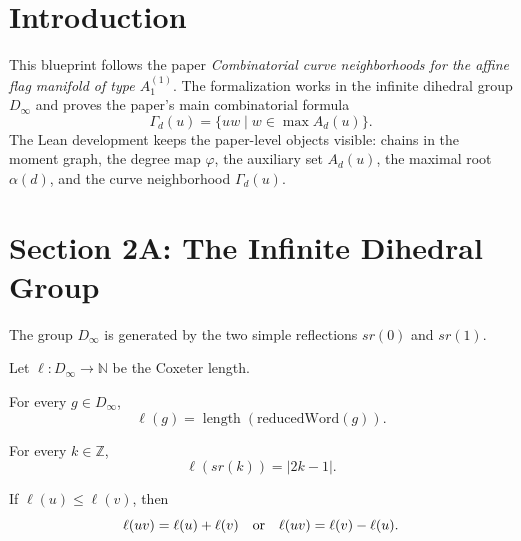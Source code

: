 \chapter{Introduction}

This blueprint follows the paper \emph{Combinatorial curve neighborhoods for
the affine flag manifold of type $A_1^{(1)}$}.  The formalization works in the
infinite dihedral group $D_\infty$ and proves the paper's main combinatorial
formula
\[
  \Gamma_d(u)=\{u w \mid w\in \max A_d(u)\}.
\]
The Lean development keeps the paper-level objects visible: chains in the
moment graph, the degree map $\varphi$, the auxiliary set $A_d(u)$, the maximal
root $\alpha(d)$, and the curve neighborhood $\Gamma_d(u)$.

\chapter{Section 2A: The Infinite Dihedral Group}

\begin{theorem}[Generators]\label{gen_by_sr0_sr1}
  \leanok
  The group $D_\infty$ is generated by the two simple reflections $sr(0)$ and
  $sr(1)$.
\end{theorem}

\begin{definition}[Length]\label{length_def}
  \leanok
  Let $\ell : D_\infty \to \mathbb N$ be the Coxeter length.
\end{definition}

\begin{theorem}\label{length_eq}
  \leanok
  For every $g\in D_\infty$,
  \[
    \ell(g)=\operatorname{length}(\mathrm{reducedWord}(g)).
  \]
\end{theorem}

\begin{theorem}\label{length_sr_abs}
  \leanok
  For every $k\in\mathbb Z$,
  \[
    \ell(sr(k))=|2k-1|.
  \]
\end{theorem}

\begin{lemma}\label{length_mul_eq_add_or_sub}
  \leanok
  If $\ell(u)\le \ell(v)$, then
  \[
    \ell(uv)=\ell(u)+\ell(v)
    \quad\hbox{or}\quad
    \ell(uv)=\ell(v)-\ell(u).
  \]
\end{lemma}

